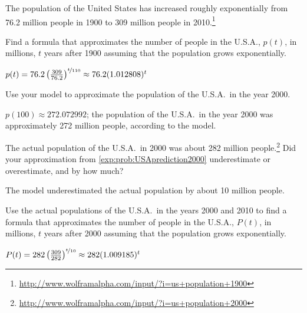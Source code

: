 \investigation*{}
\begin{problem}[US population]\label{exp:prob:uspopngreen}%
The population of the United States has increased roughly exponentially from 76.2 million 
people in 1900 to 309 million people in 2010.\footnote{\href{http://www.wolframalpha.com/input/?i=us+population+1900}{http://www.wolframalpha.com/input/?i=us+population+1900}} 
\begin{subproblem} \label{exp:prob:USApop19002010}
	Find a formula that approximates the number of people in the U.S.A., $p(t)$, in millions, $t$ 
	years after 1900 assuming that the population grows exponentially. 
	\begin{shortsolution}
		$p(t)=76.2\left( \frac{309}{76.2} \right)^{\nicefrac{t}{110}}\approx 76.2(1.012808)^t$
	\end{shortsolution}
\end{subproblem}
\begin{subproblem} \label{exp:prob:USAprediction2000}
	Use your model to approximate the population of the U.S.A.\ in the year 2000.     
	\begin{shortsolution}
		$p(100)\approx 272.072992$; the population of the U.S.A.\ in the year 2000 was approximately 272 million people, according to the model.
	\end{shortsolution}
\end{subproblem}
\begin{subproblem} 
	The actual population of the U.S.A.\ in 2000 was about 282 million people.\footnote{\href{http://www.wolframalpha.com/input/?i=us+population+1900}{http://www.wolframalpha.com/input/?i=us+population+2000}}   Did your approximation from \cref{exp:prob:USAprediction2000} 
	underestimate or overestimate, and by how much?		
	\begin{shortsolution}
		The model underestimated the actual population by about 10 million people.
	\end{shortsolution}
\end{subproblem}
\begin{subproblem}\label{exp:prob:USApop20002010}
	Use the actual populations of the U.S.A.\ in the years 2000 and 2010 to find a formula that approximates the number of people in the U.S.A., $P(t)$, in millions, $t$ years after 2000 assuming that the population grows exponentially.
	\begin{shortsolution}
		$P(t)=282\left( \frac{309}{282} \right)^{\nicefrac{t}{10}}\approx 282(1.009185)^t$

\end{shortsolution}
\end{subproblem}
\end{problem}
